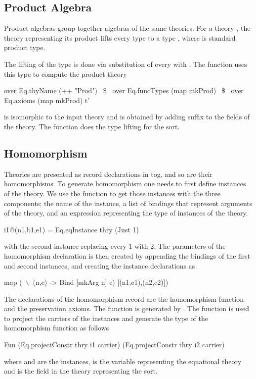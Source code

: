 \subsection{Product Algebra} 
Product algebras group together algebras of the same theories. 
For a theory , the theory  representing its product lifts every type  to a type , where  is standard product type. 
\begin{comment}
\begin{togcode}
Prod (A : Set) (B : Set) : Set
  constructor prodC
  field
   fst : A 
   snd : B  
\end{togcode}
\end{comment}
The lifting of the type  is done via substitution of every  with . 
The function  uses this type to compute the product theory 
\begin{hscode}
  over Eq.thyName (++ "Prod") ~$\$$~
  over Eq.funcTypes (map mkProd) ~$\$$~
  over Eq.axioms (map mkProd)
  t'
\end{hscode}
 is isomorphic to the input theory and is obtained by adding suffix  to the fields of the theory. The  function does the type lifting for the sort. 

\subsection{Homomorphism}
Theories are presented as record declarations in tog, and so are their homomorphisms. To generate homomorphism one needs to first define instances of the theory. We use the  function to get those instances with the three components; the name of the instance, a list of bindings that represent arguments of the theory, and an expression representing the type of instances of the theory. 
\begin{hscode}
 i1@(n1,b1,e1) = Eq.eqInstance thry (Just 1) 
\end{hscode} 
with the second instance replacing every $1$ with $2$. 
The parameters of the homomorphism declaration is then created by appending the bindings of the first and second instances, and creating the instance declarations as  
\begin{hscode} 
 map (~$\backslash$~(n,e) -> Bind [mkArg n] e) [(n1,e1),(n2,e2)])
\end{hscode} 
The declarations of the homomorphism record are the homomorphism function and the preservation axioms. The function is generated by . The function  is used to project the carriers of the instances and generate the type of the homomorphism function as follows 
\begin{hscode} 
Fun (Eq.projectConstr thry i1 carrier) (Eq.projectConstr thry i2 carrier)
\end{hscode}  
where  and  are the instances,  is the variable representing the equational theory and  is the field in the theory representing the sort. 

